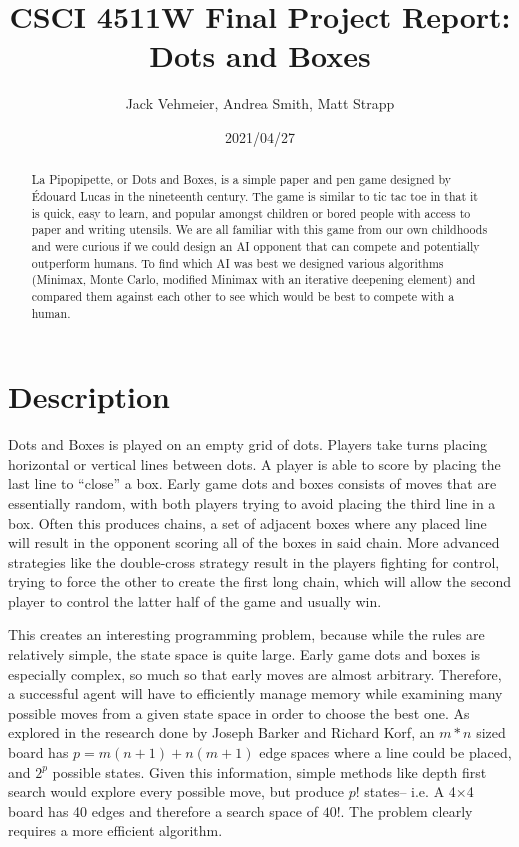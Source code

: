 \documentclass[12pt]{article}
\title{CSCI 4511W Final Project Report: Dots and Boxes}
\author{Jack Vehmeier, Andrea Smith, Matt Strapp}
\date{2021/04/27}
\begin{document}
    \maketitle
    \begin{abstract}
        La Pipopipette, or Dots and Boxes, is a simple paper and pen game designed by Édouard Lucas in the nineteenth century. The game is similar to tic tac toe in that it is quick, easy to learn, and popular amongst children or bored people with access to paper and writing utensils. We are all familiar with this game from our own childhoods and were curious if we could design an AI opponent that can compete and potentially outperform humans. To find which AI was best we designed various algorithms (Minimax, Monte Carlo, modified Minimax with an iterative deepening element) and compared them against each other to see which would be best to compete with a human. 
    \end{abstract}

    \section{Description}
    Dots and Boxes is played on an empty grid of dots. Players take turns placing horizontal or vertical lines between dots. A player is able to score by placing the last line to “close” a box. Early game dots and boxes consists of moves that are essentially random, with both players trying to avoid placing the third line in a box. Often this produces chains, a set of adjacent boxes where any placed line will result in the opponent scoring all of the boxes in said chain. More advanced strategies like the double-cross strategy result in the players fighting for control, trying to force the other to create the first long chain, which will allow the second player to control the latter half of the game and usually win.

    This creates an interesting programming problem, because while the rules are relatively simple, the state space is quite large. Early game dots and boxes is especially complex, so much so that early moves are almost arbitrary. Therefore, a successful agent will have to efficiently manage memory while examining many possible moves from a given state space in order to choose the best one. As explored in the research done by Joseph Barker and Richard Korf, an \(m * n\) sized board has \(p = m(n+1) + n(m+1)\) edge spaces where a line could be placed, and \(2^p\) possible states. Given this information, simple methods like depth first search would explore every possible move, but produce \(p!\) states-- i.e. A 4\(\times\)4 board has 40 edges and therefore a search space of \(40!\). The problem clearly requires a more efficient algorithm.
\end{document}
